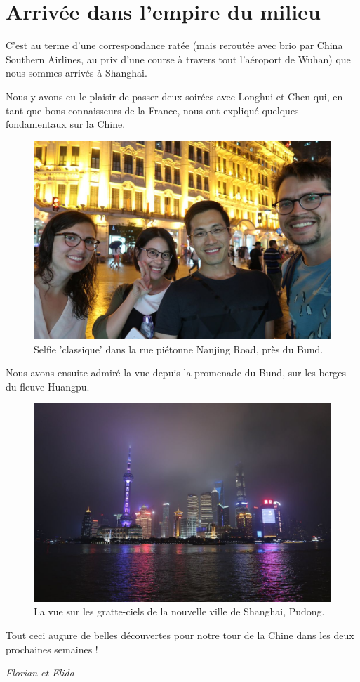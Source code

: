 \hypertarget{arrivuxe9e-dans-lempire-du-milieu}{%
\section{Arrivée dans l'empire du
milieu}\label{arrivuxe9e-dans-lempire-du-milieu}}

C'est au terme d'une correspondance ratée (mais reroutée avec brio par
China Southern Airlines, au prix d'une course à travers tout l'aéroport
de Wuhan) que nous sommes arrivés à Shanghai.

Nous y avons eu le plaisir de passer deux soirées avec Longhui et Chen
qui, en tant que bons connaisseurs de la France, nous ont expliqué
quelques fondamentaux sur la Chine.

\begin{figure}
\centering
\includegraphics{images/20180611_shanghai.JPG}
\caption{Selfie 'classique' dans la rue piétonne Nanjing Road, près du
Bund.}
\end{figure}

Nous avons ensuite admiré la vue depuis la promenade du Bund, sur les
berges du fleuve Huangpu.

\begin{figure}
\centering
\includegraphics{images/20180611_bund.JPG}
\caption{La vue sur les gratte-ciels de la nouvelle ville de Shanghai,
Pudong.}
\end{figure}

Tout ceci augure de belles découvertes pour notre tour de la Chine dans
les deux prochaines semaines !

\emph{Florian et Elida}
